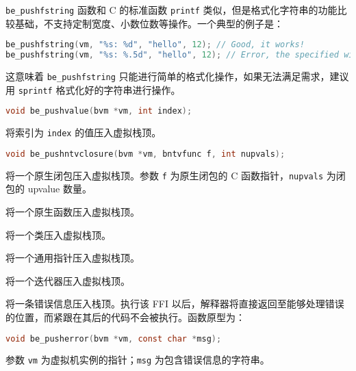 \texttt{be\_pushfstring} 函数和 C 的标准函数 \texttt{printf} 类似，但是格式化字符串的功能比较基础，不支持定制宽度、小数位数等操作。一个典型的例子是：
\begin{lstlisting}[language=c, style=berry, numbers=none]
be_pushfstring(vm, "%s: %d", "hello", 12); // Good, it works!
be_pushfstring(vm, "%s: %.5d", "hello", 12); // Error, the specified width is not supported.
\end{lstlisting}
这意味着 \texttt{be\_pushfstring} 只能进行简单的格式化操作，如果无法满足需求，建议用 \texttt{sprintf} 格式化好的字符串进行操作。


\begin{lstlisting}[language=c, style=berry, numbers=none]
void be_pushvalue(bvm *vm, int index);
\end{lstlisting}

将索引为 \texttt{index} 的值压入虚拟栈顶。


\begin{lstlisting}[language=c, style=berry, numbers=none]
void be_pushntvclosure(bvm *vm, bntvfunc f, int nupvals);
\end{lstlisting}

将一个原生闭包压入虚拟栈顶。参数 \texttt{f} 为原生闭包的 C 函数指针，\texttt{nupvals} 为闭包的 upvalue 数量。


将一个原生函数压入虚拟栈顶。


将一个类压入虚拟栈顶。


将一个通用指针压入虚拟栈顶。


将一个迭代器压入虚拟栈顶。


将一条错误信息压入栈顶。执行该 FFI 以后，解释器将直接返回至能够处理错误的位置，而紧跟在其后的代码不会被执行。函数原型为：
\begin{lstlisting}[language=c, style=berry, numbers=none]
void be_pusherror(bvm *vm, const char *msg);
\end{lstlisting}
参数 \texttt{vm} 为虚拟机实例的指针；\texttt{msg} 为包含错误信息的字符串。


